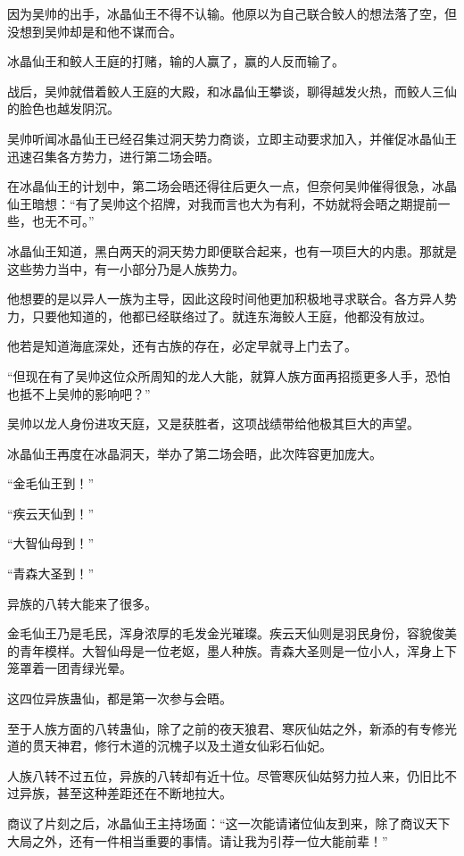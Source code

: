 
\begin{this_body}

因为吴帅的出手，冰晶仙王不得不认输。他原以为自己联合鲛人的想法落了空，但没想到吴帅却是和他不谋而合。

冰晶仙王和鲛人王庭的打赌，输的人赢了，赢的人反而输了。

战后，吴帅就借着鲛人王庭的大殿，和冰晶仙王攀谈，聊得越发火热，而鲛人三仙的脸色也越发阴沉。

吴帅听闻冰晶仙王已经召集过洞天势力商谈，立即主动要求加入，并催促冰晶仙王迅速召集各方势力，进行第二场会晤。

在冰晶仙王的计划中，第二场会晤还得往后更久一点，但奈何吴帅催得很急，冰晶仙王暗想：“有了吴帅这个招牌，对我而言也大为有利，不妨就将会晤之期提前一些，也无不可。”

冰晶仙王知道，黑白两天的洞天势力即便联合起来，也有一项巨大的内患。那就是这些势力当中，有一小部分乃是人族势力。

他想要的是以异人一族为主导，因此这段时间他更加积极地寻求联合。各方异人势力，只要他知道的，他都已经联络过了。就连东海鲛人王庭，他都没有放过。

他若是知道海底深处，还有古族的存在，必定早就寻上门去了。

“但现在有了吴帅这位众所周知的龙人大能，就算人族方面再招揽更多人手，恐怕也抵不上吴帅的影响吧？”

吴帅以龙人身份进攻天庭，又是获胜者，这项战绩带给他极其巨大的声望。

冰晶仙王再度在冰晶洞天，举办了第二场会晤，此次阵容更加庞大。

“金毛仙王到！”

“疾云天仙到！”

“大智仙母到！”

“青森大圣到！”

异族的八转大能来了很多。

金毛仙王乃是毛民，浑身浓厚的毛发金光璀璨。疾云天仙则是羽民身份，容貌俊美的青年模样。大智仙母是一位老妪，墨人种族。青森大圣则是一位小人，浑身上下笼罩着一团青绿光晕。

这四位异族蛊仙，都是第一次参与会晤。

至于人族方面的八转蛊仙，除了之前的夜天狼君、寒灰仙姑之外，新添的有专修光道的贯天神君，修行木道的沉槐子以及土道女仙彩石仙妃。

人族八转不过五位，异族的八转却有近十位。尽管寒灰仙姑努力拉人来，仍旧比不过异族，甚至这种差距还在不断地拉大。

商议了片刻之后，冰晶仙王主持场面：“这一次能请诸位仙友到来，除了商议天下大局之外，还有一件相当重要的事情。请让我为引荐一位大能前辈！”


\end{this_body}
